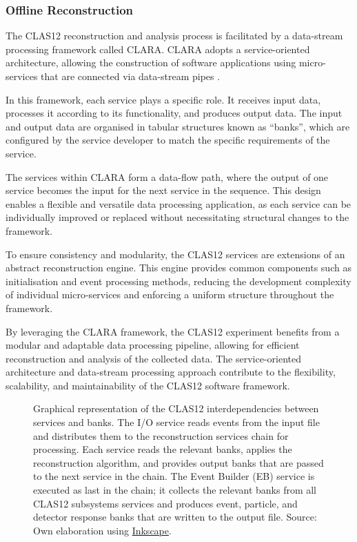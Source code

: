 \subsubsection{Offline Reconstruction}
\label{11.230::offline_reconstruction}
    The CLAS12 reconstruction and analysis process is facilitated by a data-stream processing framework called CLARA.
    CLARA adopts a service-oriented architecture, allowing the construction of software applications using micro-services that are connected via data-stream pipes \cite{gyurgyan2016}.

    In this framework, each service plays a specific role.
    It receives input data, processes it according to its functionality, and produces output data.
    The input and output data are organised in tabular structures known as ``banks'', which are configured by the service developer to match the specific requirements of the service.

    The services within CLARA form a data-flow path, where the output of one service becomes the input for the next service in the sequence.
    This design enables a flexible and versatile data processing application, as each service can be individually improved or replaced without necessitating structural changes to the framework.

    To ensure consistency and modularity, the CLAS12 services are extensions of an abstract reconstruction engine.
    This engine provides common components such as initialisation and event processing methods, reducing the development complexity of individual micro-services and enforcing a uniform structure throughout the framework.

    By leveraging the CLARA framework, the CLAS12 experiment benefits from a modular and adaptable data processing pipeline, allowing for efficient reconstruction and analysis of the collected data.
    The service-oriented architecture and data-stream processing approach contribute to the flexibility, scalability, and maintainability of the CLAS12 software framework.

    \begin{figure}[b!]
        \centering{}
        \caption[CLAS12 Reconstruction Chain.]{Graphical representation of the CLAS12 interdependencies between services and banks.
        The I/O service reads events from the input file and distributes them to the reconstruction services chain for processing.
        Each service reads the relevant banks, applies the reconstruction algorithm, and provides output banks that are passed to the next service in the chain.
        The Event Builder (EB) service is executed as last in the chain; it collects the relevant banks from all CLAS12 subsystems services and produces event, particle, and detector response banks that are written to the output file.
        Source: Own elaboration using \hyperlink{inkscape.org/}{Inkscape}.}
        \label{fig::recon_chain}
    \end{figure}

